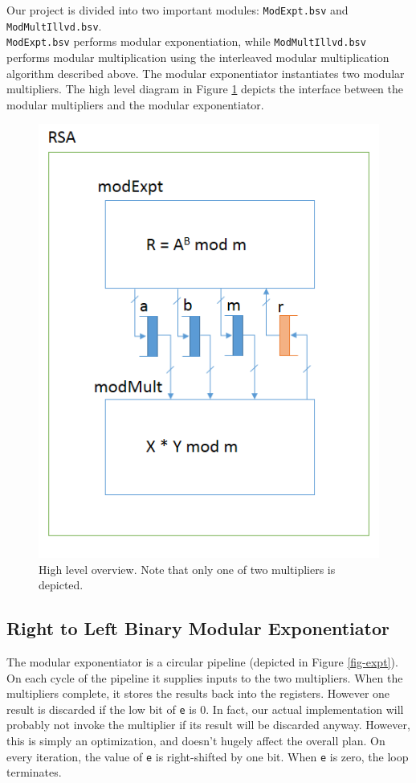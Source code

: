 \documentclass[a4paper,11pt]{report}
\begin{document}
Our project is divided into two important modules: {\tt ModExpt.bsv} and {\tt ModMultIllvd.bsv}.
\\
{\tt ModExpt.bsv} performs modular exponentiation,
while {\tt ModMultIllvd.bsv} performs modular multiplication using the interleaved modular multiplication algorithm described above.
The modular exponentiator instantiates two modular multipliers.
The high level diagram in Figure \ref{fig-top} depicts the interface between
the modular multipliers and the modular exponentiator.
\begin{figure}
  \begin{centering}
    \includegraphics[scale=1]{top_level.png}
    \caption{High level overview. Note that only one of two multipliers is depicted.}
    \label{fig-top}
  \end{centering}
\end{figure}

\subsection{Right to Left Binary Modular Exponentiator}
The modular exponentiator is a circular pipeline (depicted in Figure \ref{fig-expt}).
On each cycle of the pipeline it supplies inputs to the two multipliers.
When the multipliers complete, it stores the results back into the registers.
However one result is discarded if the low bit of {\tt e} is 0.
In fact, our actual implementation will probably not invoke the multiplier
if its result will be discarded anyway.
However, this is simply an optimization, and doesn't hugely affect the overall plan.
On every iteration, the value of {\tt e} is right-shifted by one bit.
When {\tt e} is zero, the loop terminates.
\end{document}
